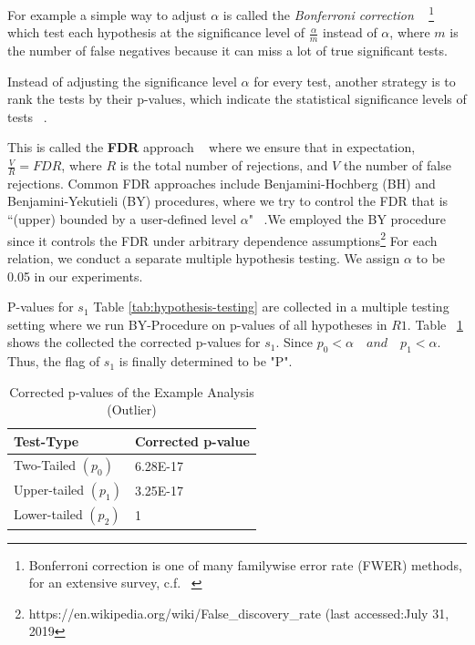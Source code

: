 For example a simple way  to adjust $\alpha$ is called the \textit{Bonferroni correction} ~\cite{Bonferroni1936} \footnote{Bonferroni correction is one of many familywise error rate
(FWER) methods, for an extensive survey, c.f. ~\cite{Zhao2017}} which test each hypothesis at the significance level of $\frac{\alpha}{m}$ instead of $\alpha$, where $m$ is the number of false negatives because it can miss a lot of true significant tests.

Instead of adjusting the significance level $\alpha$ for every test, another strategy is to rank the tests by their p-values, which indicate the statistical significance levels of tests ~\cite{Wasserstein2016}.

This is called the \textbf{FDR} approach ~\cite{Friedman2001} where we ensure that in expectation, $\frac{V}{R} = FDR$, where $R$ is the total number of rejections, and $V$
the number of false rejections. Common FDR approaches include Benjamini-Hochberg (BH) and Benjamini-Yekutieli (BY) procedures, where we try to control the FDR that is “(upper) bounded
by a user-defined level $\alpha$" ~\cite{Friedman2001}.We employed the BY
procedure since it controls the FDR under arbitrary dependence assumptions\footnote{https://en.wikipedia.org/wiki/False\_discovery\_rate (last accessed:July 31, 2019}
For each relation, we conduct a separate multiple hypothesis testing. We assign $\alpha$ to be 0.05 in our experiments.

\begin{example}
	P-values for $s_{1}$ Table \ref{tab:hypothesis-testing} are collected in a multiple testing setting where we run BY-Procedure on p-values of all hypotheses in $R1$. Table ~\ref{tab:hypothesis-testing-corrected-pvalues}
	shows the collected the corrected p-values for $s_{1}$. Since $p_{0} < \alpha \quad and \quad p_{1} < \alpha$. Thus, the flag of $s_{1}$ is finally determined to be "P".
\end{example}

\begin{table}[H]
	\centering
	\begin{tabular}{|l|l|}
		\hline
		Test-Type & Corrected p-value \\ \hline
		Two-Tailed $(p_{0})$& 6.28E-17 \\ \hline
		Upper-tailed $(p_{1})$ & 3.25E-17 \\ \hline
		Lower-tailed $(p_{2})$ & 1  \\ \hline
	\end{tabular}
	\caption{Corrected p-values of the Example Analysis (Outlier)}
	\label{tab:hypothesis-testing-corrected-pvalues}
\end{table}

